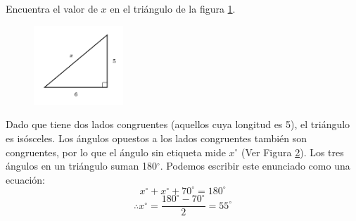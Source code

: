 Encuentra el valor de $x$ en el triángulo de la figura \ref{fig:lados_pitagoras_13}.

\begin{minipage}[t][][t]{0.35\textwidth}
    \begin{figure}[H]
        \centering
        \includegraphics[width=0.3\textwidth]{../images/lados_pitagoras_13.png}

        \caption{}
        \label{fig:lados_pitagoras_13}
    \end{figure}
\end{minipage}\hfill
\begin{minipage}[t][][t]{0.6\textwidth}
    \begin{solutionbox}{8cm}
        \begin{minipage}{0.3\textwidth}
            \begin{figure}[H]
                \centering
                \caption{}
                \label{fig:findangle10a}
            \end{figure}
        \end{minipage}\hfill
        \begin{minipage}{0.65\textwidth}
            Dado que tiene dos lados congruentes (aquellos cuya longitud es 5), el triángulo es isósceles. Los ángulos opuestos a los lados congruentes también son congruentes, por lo que el ángulo sin etiqueta mide $x^\circ$ (Ver Figura \ref{fig:findangle10a}).
            Los tres ángulos en un triángulo suman 180$^\circ$. Podemos escribir este enunciado como una ecuación:
            \[x^\circ + x^\circ + 70^\circ = 180^\circ \]
            \[\therefore x^\circ = \dfrac{180^\circ - 70^\circ}{2}  = 55^\circ\]
        \end{minipage}
    \end{solutionbox}
\end{minipage}
